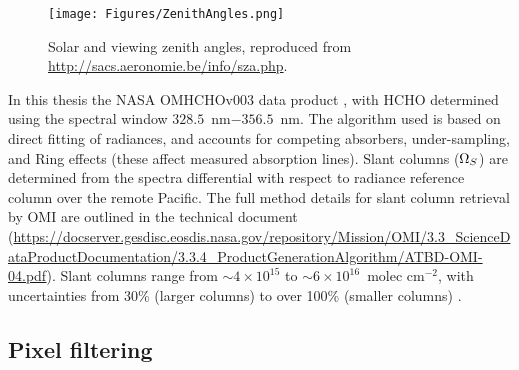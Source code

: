   
  \begin{figure}\begin{center}
      \texttt{[image: Figures/ZenithAngles.png]}
      \caption{Solar and viewing zenith angles, reproduced from \url{http://sacs.aeronomie.be/info/sza.php}. %
        }
      \label{ch_HCHO:fig:zenithangle}
    \end{center}\end{figure}
  
  In this thesis the NASA OMHCHOv003 data product \parencite{Abad2015} , with HCHO determined using the spectral window $328.5$~nm$ - 356.5$~nm. 
  The algorithm used is based on direct fitting of radiances, and accounts for competing absorbers, under-sampling, and Ring effects (these affect measured absorption lines).
  Slant columns ($\Omega_{S}$) are determined from the spectra differential with respect to radiance reference column over the remote Pacific.
  The full method details for slant column retrieval by OMI are outlined 
  in the technical document (\url{https://docserver.gesdisc.eosdis.nasa.gov/repository/Mission/OMI/3.3_ScienceDataProductDocumentation/3.3.4_ProductGenerationAlgorithm/ATBD-OMI-04.pdf}).
  Slant columns range from $\sim 4\times 10^{15} $ to $\sim 6 \times 10^{16}$~molec cm$^{-2}$, with uncertainties from 30\% (larger columns) to over 100\% (smaller columns) \parencite{Abad2015}.
  

  \subsection{Pixel filtering}
  \label{Model:omhcho:pixel_filtering}
  
